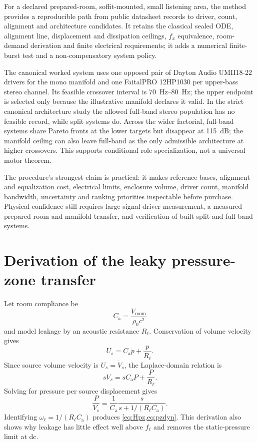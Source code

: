 \documentclass[11pt,a4paper]{article}
\numberwithin{equation}{section}
\begin{document}
For a declared prepared-room, soffit-mounted, small listening area, the
method provides a reproducible path from public datasheet records to driver,
count, alignment and architecture candidates.  It retains the classical
sealed ODE, alignment line, displacement and dissipation ceilings, $f_x$
equivalence, room-demand derivation and finite electrical requirements; it
adds a numerical finite-burst test and a non-compensatory system policy.

The canonical worked system uses one opposed pair of Dayton Audio
UMII18-22 drivers for the mono manifold and one FaitalPRO 12HP1030 per
upper-bass stereo channel.  Its feasible crossover interval is
\SIrange{70}{80}{\hertz}; the upper endpoint is selected only because the
illustrative manifold declares it valid.  In the strict canonical
architecture study the allowed full-band stereo population has no feasible
record, while split systems do.  Across the wider factorial, full-band
systems share Pareto fronts at the lower targets but disappear at
\SI{115}{dB}; the manifold ceiling can also leave full-band as the only
admissible architecture at higher crossovers.  This supports conditional
role specialization, not a universal motor theorem.

The procedure's strongest claim is practical: it makes reference bases,
alignment and equalization cost, electrical limits, enclosure volume,
driver count, manifold bandwidth, uncertainty and ranking priorities
inspectable before purchase.  Physical confidence still requires
large-signal driver measurement, a measured prepared-room and manifold
transfer, and verification of built split and full-band systems.

\appendix

\section{Derivation of the leaky pressure-zone transfer}
\label{app:room-derivation}

Let room compliance be
\begin{equation}
	C_{\mathrm a}=\frac{V_{\mathrm{room}}}{\rho_0c^2}
	\label{eq:roomCa}
\end{equation}
and model leakage by an acoustic resistance $R_\ell$.  Conservation of
volume velocity gives
\begin{equation}
	U_s=C_{\mathrm a}\dot p+\frac{p}{R_\ell}.
	\label{eq:roomflow}
\end{equation}
Since source volume velocity is $U_s=\dot V_s$, the Laplace-domain relation
is
\begin{equation}
	sV_s=sC_{\mathrm a}P+\frac{P}{R_\ell}.
	\label{eq:roomlaplace}
\end{equation}
Solving for pressure per source displacement gives
\begin{equation}
	\frac{P}{V_s}
	=\frac{1}{C_{\mathrm a}}
	\frac{s}{s+1/(R_\ell C_{\mathrm a})}.
	\label{eq:roomtransfer}
\end{equation}
Identifying $\omega_\ell=1/(R_\ell C_{\mathrm a})$ produces
\cref{eq:Hpz,eq:pzdyn}.  This derivation also shows why leakage has little
effect well above $f_\ell$ and removes the static-pressure limit at dc.
\end{document}
